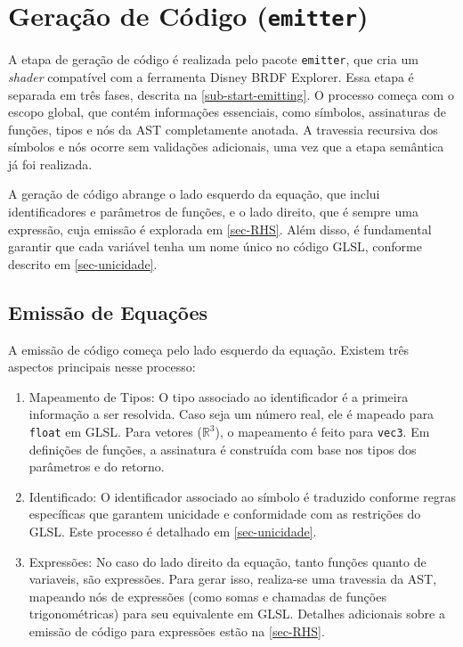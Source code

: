 
\section{Geração de Código (\texttt{emitter})} \label{section-emitter}


A etapa de geração de código é realizada pelo pacote \texttt{emitter}, que cria um \textit{shader} compatível com a ferramenta Disney BRDF Explorer. Essa etapa é separada em três fases, descrita na \autoref{sub-start-emitting}. O processo começa com o escopo global, que contém informações essenciais, como símbolos, assinaturas de funções, tipos e nós da AST completamente anotada. A travessia recursiva dos símbolos e nós ocorre sem validações adicionais, uma vez que a etapa semântica já foi realizada.

A geração de código abrange o lado esquerdo da equação, que inclui identificadores e parâmetros de funções, e o lado direito, que é sempre uma expressão, cuja emissão é explorada em \autoref{sec-RHS}. Além disso, é fundamental garantir que cada variável tenha um nome único no código GLSL, conforme descrito em \autoref{sec-unicidade}.

\subsection{Emissão de Equações} \label{subsection-emission}

A emissão de código começa pelo lado esquerdo da equação. Existem três aspectos principais nesse processo:
\begin{enumerate}
    \item Mapeamento de Tipos: O tipo associado ao identificador é a primeira informação a ser resolvida. Caso seja um número real, ele é mapeado para \verb"float" em GLSL. Para vetores ($\mathbb{R}^3$), o mapeamento é feito para \verb"vec3". Em definições de funções, a assinatura é construída com base nos tipos dos parâmetros e do retorno.

    \item Identificado: O identificador associado ao símbolo é traduzido conforme regras específicas que garantem unicidade e conformidade com as restrições do GLSL. Este processo é detalhado em \autoref{sec-unicidade}.

    \item Expressões: No caso do lado direito da equação, tanto funções quanto de variaveis, são expressões. Para gerar isso, realiza-se uma travessia da AST, mapeando nós de expressões (como somas e chamadas de funções trigonométricas) para seu equivalente em GLSL. Detalhes adicionais sobre a emissão de código para expressões estão na \autoref{sec-RHS}.
\end{enumerate}



